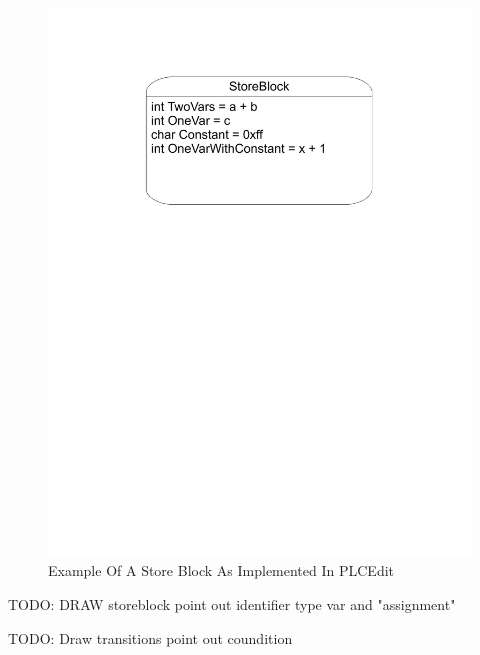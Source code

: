 \begin{figure}[htp]
    \centering
    \includegraphics[trim= 20mm 170mm 20mm 10mm, clip, width=\imgmedium]{./images/state_storeblock.pdf}
    \caption{Example Of A Store Block As Implemented In PLCEdit}
    \label{fig:state_storeblock}
\end{figure}

TODO: DRAW storeblock point out identifier type var and "assignment"

TODO: Draw transitions point out coundition

